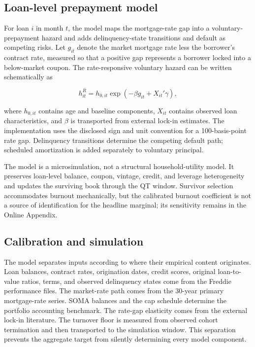 \subsection{Loan-level prepayment model}

For loan $i$ in month $t$, the model maps the mortgage-rate gap into a voluntary-prepayment hazard and adds delinquency-state transitions and default as competing risks. Let $g_{it}$ denote the market mortgage rate less the borrower's contract rate, measured so that a positive gap represents a borrower locked into a below-market coupon. The rate-responsive voluntary hazard can be written schematically as

\begin{equation}
h^{R}_{it}=h_{0,it}\exp(-\beta g_{it}+X_{it}'\gamma),
\label{eq:ratehazard}
\end{equation}
\label{eq:beta1}\label{eq:pathB}\label{eq:default}

where $h_{0,it}$ contains age and baseline components, $X_{it}$ contains observed loan characteristics, and $\beta$ is transported from external lock-in estimates. The implementation uses the disclosed sign and unit convention for a 100-basis-point rate gap. Delinquency transitions determine the competing default path; scheduled amortization is added separately to voluntary principal.

The model is a microsimulation, not a structural household-utility model. It preserves loan-level balance, coupon, vintage, credit, and leverage heterogeneity and updates the surviving book through the QT window. Survivor selection accommodates burnout mechanically, but the calibrated burnout coefficient is not a source of identification for the headline marginal; its sensitivity remains in the Online Appendix.

\subsection{Calibration and simulation}

The model separates inputs according to where their empirical content originates. Loan balances, contract rates, origination dates, credit scores, original loan-to-value ratios, terms, and observed delinquency states come from the Freddie performance files. The market-rate path comes from the 30-year primary mortgage-rate series. SOMA balances and the cap schedule determine the portfolio accounting benchmark. The rate-gap elasticity comes from the external lock-in literature. The turnover floor is measured from observed cohort termination and then transported to the simulation window. This separation prevents the aggregate target from silently determining every model component.

